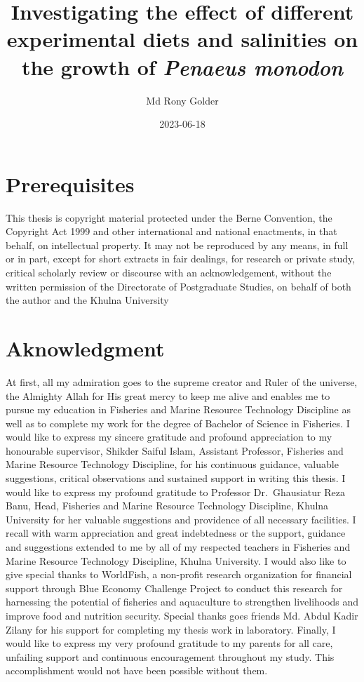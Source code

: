 \documentclass[
]{book}
\title{Investigating the effect of different experimental diets and salinities on the growth of \emph{Penaeus monodon}}
\author{Md Rony Golder}
\date{2023-06-18}
\begin{document}
\maketitle

{
\setcounter{tocdepth}{1}
\tableofcontents
}
\hypertarget{prerequisites}{%
\chapter*{Prerequisites}\label{prerequisites}}

This thesis is copyright material protected under the Berne Convention, the Copyright Act 1999 and other international and national enactments, in that behalf, on intellectual property. It may not be reproduced by any means, in full or in part, except for short extracts in fair dealings, for research or private study, critical scholarly review or discourse with an acknowledgement, without the written permission of the Directorate of Postgraduate Studies, on behalf of both the author and the Khulna University

\hypertarget{aknowledgment}{%
\chapter*{Aknowledgment}\label{aknowledgment}}

At first, all my admiration goes to the supreme creator and Ruler of the universe, the Almighty
Allah for His great mercy to keep me alive and enables me to pursue my education in Fisheries
and Marine Resource Technology Discipline as well as to complete my work for the degree of
Bachelor of Science in Fisheries.
I would like to express my sincere gratitude and profound appreciation to my honourable
supervisor, Shikder Saiful Islam, Assistant Professor, Fisheries and Marine Resource Technology
Discipline, for his continuous guidance, valuable suggestions, critical observations and sustained
support in writing this thesis.
I would like to express my profound gratitude to Professor Dr.~Ghausiatur Reza Banu, Head,
Fisheries and Marine Resource Technology Discipline, Khulna University for her valuable
suggestions and providence of all necessary facilities.
I recall with warm appreciation and great indebtedness or the support, guidance and suggestions
extended to me by all of my respected teachers in Fisheries and Marine Resource Technology
Discipline, Khulna University.
I would also like to give special thanks to WorldFish, a non-profit research organization for
financial support through Blue Economy Challenge Project to conduct this research for harnessing
the potential of fisheries and aquaculture to strengthen livelihoods and improve food and nutrition
security.
Special thanks goes friends Md. Abdul Kadir Zilany for his support for completing my thesis work
in laboratory.
Finally, I would like to express my very profound gratitude to my parents for all care, unfailing
support and continuous encouragement throughout my study. This accomplishment would not
have been possible without them.
\end{document}
